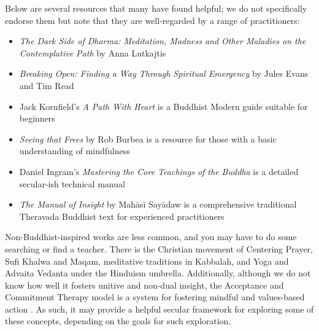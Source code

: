 \documentclass[12pt,letterpaper]{book}
\begin{document}
Below are several resources that many have found helpful; we do not specifically endorse them but note that they are well-regarded by a range of practitioners:
\begin{itemize}
    \item \textit{The Dark Side of Dharma: Meditation, Madness and Other Maladies on the Contemplative Path} by Anna Lutkajtis \cite{lutkajtis2021dark}
    \item \textit{Breaking Open: Finding a Way Through Spiritual Emergency} by Jules Evans and Tim Read \cite{evans2020}
    \item Jack Kornfield's \textit{A Path With Heart} is a Buddhist Modern guide suitable for beginners \cite{kornfield1993path}
    \item \textit{Seeing that Frees} by Rob Burbea is a resource for those with a basic understanding of mindfulness \cite{burbea2014seeing}
    \item Daniel Ingram's \textit{Mastering the Core Teachings of the Buddha} is a detailed secular-ish technical manual \cite{ingram2018mastering}
    \item \textit{The Manual of Insight} by Mahāsī Sayādaw is a comprehensive traditional Theravada Buddhist text for experienced practitioners \cite{sayadaw2016manual}
\end{itemize}
Non-Buddhist-inspired works are less common, and you may have to do some searching or find a teacher. There is the Christian movement of Centering Prayer, Sufi Khalwa and Maqam, meditative traditions in Kabbalah, and Yoga and Advaita Vedanta under the Hinduism umbrella. Additionally, although we do not know how well it fosters unitive and non-dual insight, the Acceptance and Commitment Therapy model is a system for fostering mindful and values-based action \cite{actSimple}. As such, it may provide a helpful secular framework for exploring some of these concepts, depending on the goals for such exploration.
\end{document}
